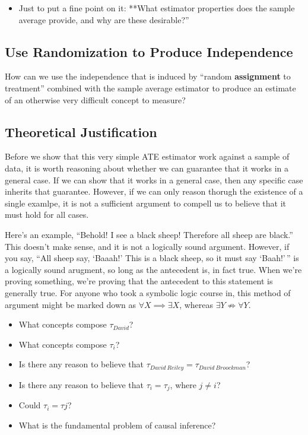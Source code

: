 \documentclass[
]{article}
\providecommand{\tightlist}{%
  \setlength{\itemsep}{0pt}\setlength{\parskip}{0pt}}
\theoremstyle{definition}
\theoremstyle{definition}
\theoremstyle{definition}
\theoremstyle{definition}
\theoremstyle{remark}
\begin{document}
\begin{itemize}
\tightlist
\item
  Just to put a fine point on it: **What estimator properties does the sample average provide, and why are these desirable?''
\end{itemize}

\subsection{Use Randomization to Produce Independence}\label{use-randomization-to-produce-independence}

How can we use the independence that is induced by ``random \textbf{assignment} to treatment'' combined with the sample average estimator to produce an estimate of an otherwise very difficult concept to measure?

\subsection{Theoretical Justification}\label{theoretical-justification}

Before we show that this very simple ATE estimator work against a sample of data, it is worth reasoning about whether we can guarantee that it works in a general case. If we can show that it works in a general case, then any specific case inherits that guarantee. However, if we can only reason thorugh the existence of a single examlpe, it is not a sufficient argument to compell us to believe that it must hold for all cases.

Here's an example, ``Behold! I see a black sheep! Therefore all sheep are black.'' This doesn't make sense, and it is not a logically sound argument. However, if you say, ``All sheep say, `Baaah!' This is a black sheep, so it must say `Baah!'\,'' is a logically sound arugment, so long as the antecedent is, in fact true. When we're proving something, we're proving that the antecedent to this statement is generally true. For anyone who took a symbolic logic course in, this method of argument might be marked down as \(\forall X \implies \exists X\), whereas \(\exists Y \not\Rightarrow \forall Y\).

\begin{itemize}
\tightlist
\item
  What concepts compose \(\tau_{David}\)?
\item
  What concepts compose \(\tau_{i}\)?
\item
  Is there any reason to believe that \(\tau_{David\ Reiley} = \tau_{David\ Broockman}\)?
\item
  Is there any reason to believe that \(\tau_{i} = \tau_{j}\), where \(j \neq i\)?
\item
  Could \(\tau_{i} = \tau{j}\)?
\item
  What is the fundamental problem of causal inference?
\end{itemize}
\end{document}
